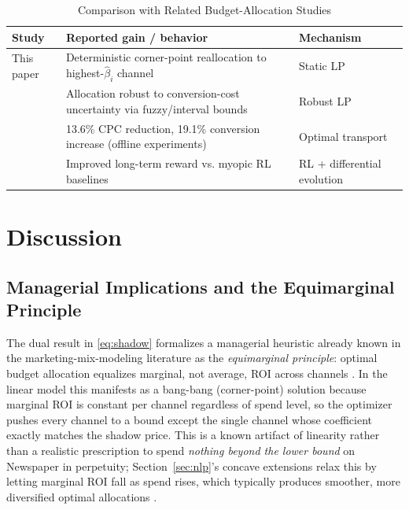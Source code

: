 \documentclass[conference]{IEEEtran}
\begin{document}
\begin{table}[t]
\caption{Comparison with Related Budget-Allocation Studies}
\label{tab:comparison}
\centering
\renewcommand{\arraystretch}{1.15}
\begin{tabular}{p{1.6cm}p{2.5cm}p{3.3cm}}
\toprule
\textbf{Study} & \textbf{Reported gain / behavior} & \textbf{Mechanism} \\
\midrule
This paper & Deterministic corner-point reallocation to highest-$\hat\beta_i$ channel & Static LP \\
\cite{robust_lp_2025} & Allocation robust to conversion-cost uncertainty via fuzzy/interval bounds & Robust LP \\
\cite{adcob_2023} & 13.6\% CPC reduction, 19.1\% conversion increase (offline experiments) & Optimal transport \\
\cite{li_ieee_access_2024} & Improved long-term reward vs. myopic RL baselines & RL + differential evolution \\
\bottomrule
\end{tabular}
\end{table}

\section{Discussion}
\label{sec:discussion}

\subsection{Managerial Implications and the Equimarginal Principle}
The dual result in \eqref{eq:shadow} formalizes a managerial heuristic already known in the marketing-mix-modeling literature as the \emph{equimarginal principle}: optimal budget allocation equalizes marginal, not average, ROI across channels \cite{mmm_diminishing_returns}. In the linear model this manifests as a bang-bang (corner-point) solution because marginal ROI is constant per channel regardless of spend level, so the optimizer pushes every channel to a bound except the single channel whose coefficient exactly matches the shadow price. This is a known artifact of linearity rather than a realistic prescription to spend \emph{nothing beyond the lower bound} on Newspaper in perpetuity; Section~\ref{sec:nlp}'s concave extensions relax this by letting marginal ROI fall as spend rises, which typically produces smoother, more diversified optimal allocations \cite{mmm_saturation_curves}.
\end{document}
